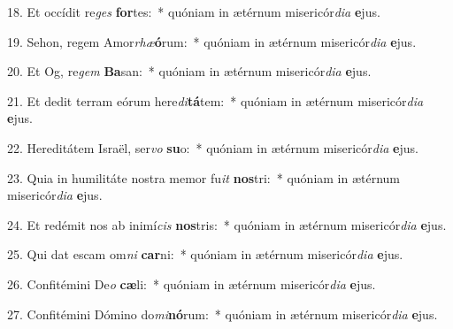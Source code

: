 18. Et occídit re\textit{ges} \textbf{for}tes:~*  quóniam in ætérnum misericór\textit{di}\textit{a} \textbf{e}jus.\

19. Sehon, regem Amor\textit{rhæ}\textbf{ó}rum:~*  quóniam in ætérnum misericór\textit{di}\textit{a} \textbf{e}jus.\

20. Et Og, re\textit{gem} \textbf{Ba}san:~*  quóniam in ætérnum misericór\textit{di}\textit{a} \textbf{e}jus.\

21. Et dedit terram eórum here\textit{di}\textbf{tá}tem:~*  quóniam in ætérnum misericór\textit{di}\textit{a} \textbf{e}jus.\

22. Hereditátem Israël, ser\textit{vo} \textbf{su}o:~*  quóniam in ætérnum misericór\textit{di}\textit{a} \textbf{e}jus.\

23. Quia in humilitáte nostra memor fu\textit{it} \textbf{nos}tri:~*  quóniam in ætérnum misericór\textit{di}\textit{a} \textbf{e}jus.\

24. Et redémit nos ab inimí\textit{cis} \textbf{nos}tris:~*  quóniam in ætérnum misericór\textit{di}\textit{a} \textbf{e}jus.\

25. Qui dat escam om\textit{ni} \textbf{car}ni:~*  quóniam in ætérnum misericór\textit{di}\textit{a} \textbf{e}jus.\

26. Confitémini De\textit{o} \textbf{cæ}li:~*  quóniam in ætérnum misericór\textit{di}\textit{a} \textbf{e}jus.\

27. Confitémini Dómino do\textit{mi}\textbf{nó}rum:~*  quóniam in ætérnum misericór\textit{di}\textit{a} \textbf{e}jus.\

